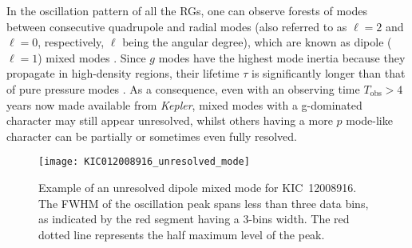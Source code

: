 \documentclass[structabstract]{aa}
\newcommand{\Kepler}{\textit{Kepler}}
\newcommand{\kic}{KIC~12008916}
\begin{document}
In the oscillation pattern of all the RGs, one can observe forests of modes between consecutive quadrupole and radial modes (also referred to as $\ell = 2$ and $\ell = 0$, respectively, $\ell$ being the angular degree), which are known as dipole ($\ell = 1$) mixed modes \citep{Beck11Science,Bedding11Nature,Mosser11mixed}. Since $g$ modes have the highest mode inertia because they propagate in high-density regions, their lifetime $\tau$ is significantly longer than that of pure pressure modes \citep[e.g. see][]{CD04}. As a consequence, even with an observing time $T_\mathrm{obs} > 4$ years now made available from \Kepler, mixed modes with a g-dominated character may still appear unresolved, whilst others having a more $p$ mode-like character can be partially or sometimes even fully resolved. 

\begin{figure}
   \centering
   \texttt{[image: KIC012008916\_unresolved\_mode]}
      \caption{Example of an unresolved dipole mixed mode for \kic. The FWHM of the oscillation peak spans less than three data bins, as indicated by the red segment having a 3-bins width. The red dotted line represents the half maximum level of the peak.}
    \label{fig:unresolved_peak}
\end{figure}
\end{document}
